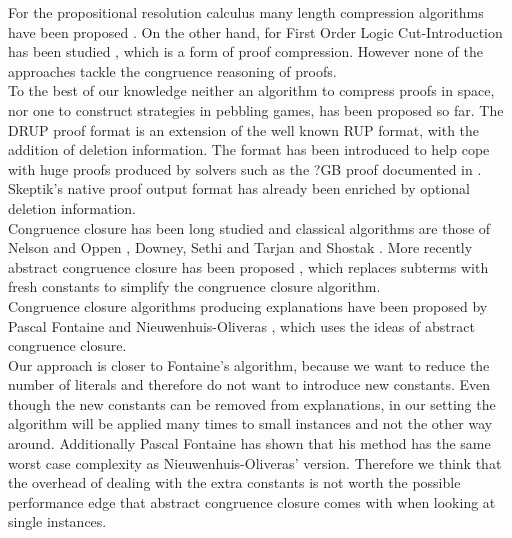 For the propositional resolution calculus many length compression algorithms have been proposed \cite{TODO: quote all the algorithms}. 
On the other hand, for First Order Logic Cut-Introduction has been studied \cite{TODO: Leitsch's group papers}, which is a form of proof compression. However none of the approaches tackle the congruence reasoning of proofs.\\
To the best of our knowledge neither an algorithm to compress proofs in space, nor one to construct strategies in pebbling games, has been proposed so far. 
The DRUP proof format \cite{TODO: Drup format} is an extension of the well known RUP format, with the addition of deletion information.
The format has been introduced to help cope with huge proofs produced by solvers such as the ?GB proof documented in \cite{TODO: the big proof thing}.
Skeptik's native proof output format has already been enriched by optional deletion information.\\
Congruence closure has been long studied and classical algorithms are those of Nelson and Oppen \cite{TODO: Nelson-Oppen paper}, Downey, Sethi and Tarjan \cite{TODO: DST Paper} and Shostak \cite{TODO: Shostak paper}. %
More recently abstract congruence closure has been proposed \cite{TODO:Abstract Congruence Closure and Specializations paper}, which replaces subterms with fresh constants to simplify the congruence closure algorithm.\\
Congruence closure algorithms producing explanations have been proposed by Pascal Fontaine \cite{TODO: Pascals Thesis} and Nieuwenhuis-Oliveras \cite{TODO: BarceLogic CC paper}, which uses the ideas of abstract congruence closure.\\
Our approach is closer to Fontaine's algorithm, because we want to reduce the number of literals and therefore do not want to introduce new constants.
Even though the new constants can be removed from explanations, in our setting the algorithm will be applied many times to small instances and not the other way around. 
Additionally Pascal Fontaine has shown that his method has the same worst case complexity as Nieuwenhuis-Oliveras' version. Therefore we think that the overhead of dealing with the extra constants is not worth the possible performance edge \cite{TODO: paper empirically comparing CC algorithms} that abstract congruence closure comes with when looking at single instances.